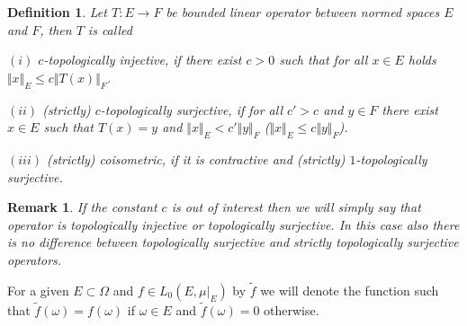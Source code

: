 \documentclass[12pt]{article}
\newtheorem{remark}[theorem]{Remark}
\newtheorem{definition}[theorem]{Definition}
\begin{document}
\begin{definition}\label{DefNorOpType} Let $ T:E\to F$ be bounded linear
    operator between normed spaces $E$ and $F$, then $ T$ is called
    
    $(i)$ \textit{$c$-topologically injective}, if there exist $c > 0$ such that
    for all $x \in E$ holds $\Vert x\Vert_E\leq c\Vert  T(x)\Vert_F$.
    
    $(ii)$ \textit{(strictly) $c$-topologically surjective}, if for all $c'>c$
    and  $y\in F$ there exist $x \in E$ such that $ T(x) = y$ and 
    $\Vert x \Vert_E < c' \Vert y \Vert_F$ 
    ($\Vert x \Vert_E \leq c \Vert y \Vert_F$).
    
    $(iii)$ (strictly) coisometric, if it is contractive and (strictly)
    $1$-topologically surjective.
\end{definition}

\begin{remark} If the constant $c$ is out of interest then we will simply say
    that operator is topologically injective or topologically surjective. In
    this case also there is no difference between topologically surjective and
    strictly topologically surjective operators.
\end{remark}

For a given $E\subset \Omega$ and $f\in L_0(E,\mu|_{E})$ by $\widetilde{f}$ we
will denote the function such that $\widetilde{f}(\omega)=f(\omega)$ if
$\omega\in E$ and $\widetilde{f}(\omega)=0$ otherwise.
\end{document}
